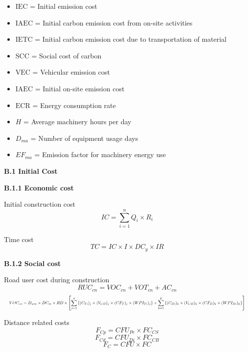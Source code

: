 \documentclass[12pt,a4paper]{article}
\begin{document}
\begin{itemize}
\item $\mathrm{IEC}$ = Initial emission cost
\item $\mathrm{IAEC}$ = Initial carbon emission cost from on-site activities
\item $\mathrm{IETC}$ = Initial carbon emission cost due to transportation of material
\item $\mathrm{SCC}$ = Social cost of carbon
\item $\mathrm{VEC}$ = Vehicular emission cost
\item $\mathrm{IAEC}$ = Initial on-site emission cost
\item $\mathrm{ECR}$ = Energy consumption rate
\item $H$ = Average machinery hours per day
\item $D_{ma}$ = Number of equipment usage days
\item $EF_{ma}$ = Emission factor for machinery energy use
\end{itemize}

\vspace{0.5em}

{\bfseries B.1 Initial Cost}

\vspace{0.3em}
\textbf{B.1.1 Economic cost}

\noindent
Initial construction cost
\[
IC = \sum_{i=1}^{n} Q_i \times R_i
\]

\noindent
Time cost
\[
TC = IC \times I \times DC_y \times IR
\]

\vspace{0.3em}
\textbf{B.1.2 Social cost}

\noindent
Road user cost during construction
\[
RUC_{cn} = VOC_{cn} + VOT_{cn} + AC_{cn}
\]
\[
\resizebox{\linewidth}{!}{$\displaystyle
VOC_{cn} = D_{wm} \times DC_m \times RD \times
\left[
  \sum_{j=1}^{o} \left\{ (C_{Ti})_{j} \times (V_{CD})_{j} \times (CF_{T})_{j} \times (WPI_{Ti})_{j} \right\}
  + \sum_{k=1}^{p} \left\{ (C_{Di})_{k} \times (V_{CD})_{k} \times (CF_{D})_{k} \times (WPI_{Di})_{k} \right\}
\right]
$}
\]

\noindent
Distance related costs
\[
F_{Cp} = CFU_{Pe} \times FC_{CS}
\]
\[
F_{Cd} = CFU_{Di} \times FC_{CB}
\]
\[
F_{C} = CFU \times FC
\]
\end{document}
